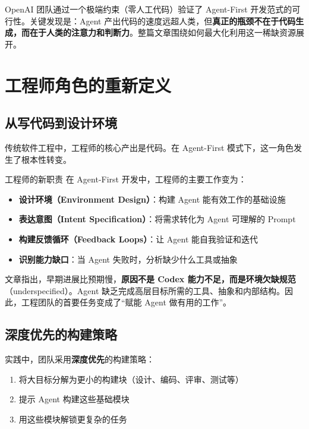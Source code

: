 \documentclass[a4paper]{article}
\begin{document}
OpenAI 团队通过一个极端约束（零人工代码）验证了 Agent-First 开发范式的可行性。关键发现是：Agent 产出代码的速度远超人类，但\textbf{真正的瓶颈不在于代码生成，而在于人类的注意力和判断力}。整篇文章围绕如何最大化利用这一稀缺资源展开。

\newpage

\section{工程师角色的重新定义}

\subsection{从写代码到设计环境}

传统软件工程中，工程师的核心产出是代码。在 Agent-First 模式下，这一角色发生了根本性转变。

\begin{importantbox}{工程师的新职责}
在 Agent-First 开发中，工程师的主要工作变为：
\begin{itemize}[nosep]
  \item \textbf{设计环境（Environment Design）}：构建 Agent 能有效工作的基础设施
  \item \textbf{表达意图（Intent Specification）}：将需求转化为 Agent 可理解的 Prompt
  \item \textbf{构建反馈循环（Feedback Loops）}：让 Agent 能自我验证和迭代
  \item \textbf{识别能力缺口}：当 Agent 失败时，分析缺少什么工具或抽象
\end{itemize}
\end{importantbox}

文章指出，早期进展比预期慢，\textbf{原因不是 Codex 能力不足，而是环境欠缺规范}（underspecified）。Agent 缺乏完成高层目标所需的工具、抽象和内部结构。因此，工程团队的首要任务变成了``赋能 Agent 做有用的工作''。

\subsection{深度优先的构建策略}

实践中，团队采用\textbf{深度优先}的构建策略：

\begin{enumerate}[nosep]
  \item 将大目标分解为更小的构建块（设计、编码、评审、测试等）
  \item 提示 Agent 构建这些基础模块
  \item 用这些模块解锁更复杂的任务
\end{enumerate}
\end{document}
